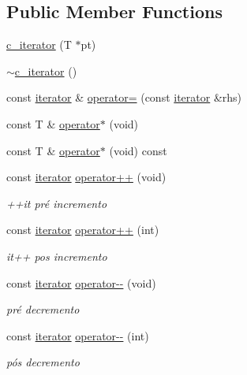 \subsection*{Public Member Functions}
\begin{DoxyCompactItemize}
\item 
\hyperlink{classsc_1_1vector_1_1c__iterator_a54eede6a5a05f6c0f5f9ff2f2839626f}{c\+\_\+iterator} (T $\ast$pt)
\item 
\hyperlink{classsc_1_1vector_1_1c__iterator_ab38a9e7b5bd73dceaabe12824e15c9d3}{$\sim$c\+\_\+iterator} ()
\item 
const \hyperlink{classsc_1_1vector_1_1iterator}{iterator} \& \hyperlink{classsc_1_1vector_1_1c__iterator_a7541fc3d6c1e4bd7552cfc3c0b0e30f6}{operator=} (const \hyperlink{classsc_1_1vector_1_1iterator}{iterator} \&rhs)
\item 
const T \& \hyperlink{classsc_1_1vector_1_1c__iterator_a5ff127a4bab167a04f5e06b631f550ea}{operator$\ast$} (void)
\item 
const T \& \hyperlink{classsc_1_1vector_1_1c__iterator_a9d0374b03be5c6e00e5880ac34e67452}{operator$\ast$} (void) const
\item 
const \hyperlink{classsc_1_1vector_1_1iterator}{iterator} \hyperlink{classsc_1_1vector_1_1c__iterator_ae786b70468aac8cad04da563b169fb44}{operator++} (void)
\begin{DoxyCompactList}\small\item\em ++it pré incremento \end{DoxyCompactList}\item 
const \hyperlink{classsc_1_1vector_1_1iterator}{iterator} \hyperlink{classsc_1_1vector_1_1c__iterator_a33a4feec02a8109f615bbaf256f5e86a}{operator++} (int)
\begin{DoxyCompactList}\small\item\em it++ pos incremento \end{DoxyCompactList}\item 
const \hyperlink{classsc_1_1vector_1_1iterator}{iterator} \hyperlink{classsc_1_1vector_1_1c__iterator_a4ae80e4a75b12f8ae8cac34f4b57b83e}{operator-\/-\/} (void)
\begin{DoxyCompactList}\small\item\em pré decremento \end{DoxyCompactList}\item 
const \hyperlink{classsc_1_1vector_1_1iterator}{iterator} \hyperlink{classsc_1_1vector_1_1c__iterator_a02b8cdb8cc3aa103f568189704748935}{operator-\/-\/} (int)
\begin{DoxyCompactList}\small\item\em pós decremento \end{DoxyCompactList}\item 

\end{DoxyCompactItemize}
